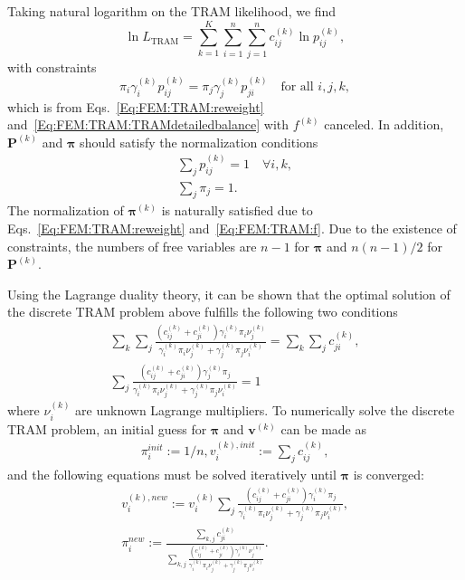 Taking natural logarithm on the TRAM likelihood, we find
\begin{equation}
    \ln{L_{\mathrm{TRAM}}}=\sum_{k=1}^{K}\sum_{i=1}^n\sum_{j=1}^{n}c_{ij}^{(k)}\ln{p_{ij}^{(k)}},
\end{equation}
with constraints
\begin{equation}
    \pi_i\gamma_i^{(k)}p_{ij}^{(k)}=\pi_j\gamma_j^{(k)}p_{ji}^{(k)}\quad \text{for all }i,j,k,
\end{equation}
which is from Eqs.~\ref{Eq:FEM:TRAM:reweight} and~\ref{Eq:FEM:TRAM:TRAMdetailedbalance} with $f^{(k)}$ canceled. In addition, $\mathbf{P}^{(k)}$ and $\boldsymbol{\pi}$ should satisfy the normalization conditions
\begin{align}
	\sum_{j}p_{ij}^{(k)}=1 \quad \forall i,k,\\
	\sum_j \pi_j=1.
\end{align}
The normalization of $\boldsymbol{\pi}^{(k)}$ is naturally satisfied due to Eqs.~\ref{Eq:FEM:TRAM:reweight} and~\ref{Eq:FEM:TRAM:f}. Due to the existence of constraints, the numbers of free variables are $n-1$ for $\boldsymbol{\pi}$ and $n(n-1)/2$ for $\mathbf{P}^{(k)}$.

Using the Lagrange duality theory, it can be shown that the optimal solution of the discrete TRAM problem above fulfills the following two conditions
\begin{align}
	\sum_k\sum_j\frac{(c_{ij}^{(k)}+c_{ji}^{(k)})\gamma_i^{(k)}\pi_i\nu_j^{(k)}}{\gamma_i^{(k)}\pi_i\nu_j^{(k)}+\gamma_j^{(k)}\pi_j\nu_i^{(k)}}=\sum_k\sum_jc_{ji}^{(k)},\\
	\sum_j\frac{(c_{ij}^{(k)}+c_{ji}^{(k)})\gamma_j^{(k)}\pi_j}{\gamma_i^{(k)}\pi_i\nu_j^{(k)}+\gamma_j^{(k)}\pi_j\nu_i^{(k)}}=1
\end{align}
where $\nu_i^{(k)}$ are unknown Lagrange multipliers. To numerically solve the discrete TRAM problem, an initial guess for $\boldsymbol{\pi}$ and $\mathbf{v}^{(k)}$ can be made as
\begin{align}
	\pi_i^{init}:=1/n,
	v_i^{(k),init}:=\sum_j c_{ij}^{(k)},
\end{align}
and the following equations must be solved iteratively until $\boldsymbol{\pi}$ is converged:
\begin{align}
	v_i^{(k),new}:=v_i^{(k)}\sum_j \frac{(c_{ij}^{(k)}+c_{ji}^{(k)})\gamma_i^{(k)}\pi_j}{\gamma_i^{(k)}\pi_i\nu_j^{(k)}+\gamma_j^{(k)}\pi_j\nu_i^{(k)}},\\
	\pi_i^{new}:=\frac{\sum_{k,j}c_{ji}^{(k)}}{\sum_{k,j}\frac{(c_{ij}^{(k)}+c_{ji}^{(k)})\gamma_i^{(k)}\nu_j^{(k)}}{\gamma_i^{(k)}\pi_i\nu_j^{(k)}+\gamma_j^{(k)}\pi_j\nu_i^{(k)}}}.
\end{align}